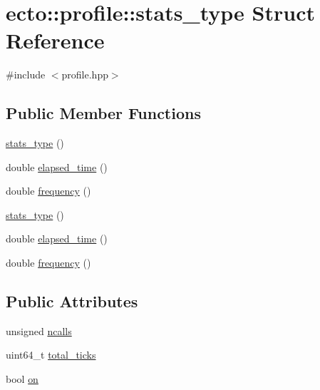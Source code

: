 \hypertarget{structecto_1_1profile_1_1stats__type}{\section{ecto\-:\-:profile\-:\-:stats\-\_\-type Struct Reference}
\label{structecto_1_1profile_1_1stats__type}
}


{\ttfamily \#include $<$profile.\-hpp$>$}

\subsection*{Public Member Functions}
\begin{DoxyCompactItemize}
\item 
\hyperlink{structecto_1_1profile_1_1stats__type_ab34b76c48cbf95d269a5307a5bbb2fe8}{stats\-\_\-type} ()
\item 
double \hyperlink{structecto_1_1profile_1_1stats__type_aca1fbd5470c0485c965f62c796e3286c}{elapsed\-\_\-time} ()
\item 
double \hyperlink{structecto_1_1profile_1_1stats__type_ad595fe2ba3250310a832a776dfc53b9c}{frequency} ()
\item 
\hyperlink{structecto_1_1profile_1_1stats__type_ab34b76c48cbf95d269a5307a5bbb2fe8}{stats\-\_\-type} ()
\item 
double \hyperlink{structecto_1_1profile_1_1stats__type_aca1fbd5470c0485c965f62c796e3286c}{elapsed\-\_\-time} ()
\item 
double \hyperlink{structecto_1_1profile_1_1stats__type_ad595fe2ba3250310a832a776dfc53b9c}{frequency} ()
\end{DoxyCompactItemize}
\subsection*{Public Attributes}
\begin{DoxyCompactItemize}
\item 
unsigned \hyperlink{structecto_1_1profile_1_1stats__type_a570c8df89c2318ab98757e29670ba70b}{ncalls}
\item 
uint64\-\_\-t \hyperlink{structecto_1_1profile_1_1stats__type_affa2973693dec71733bcf8f7b6cf9c0b}{total\-\_\-ticks}
\item 
bool \hyperlink{structecto_1_1profile_1_1stats__type_a25c84366176dc49eb9b113a4e74c6b5a}{on}
\end{DoxyCompactItemize}


